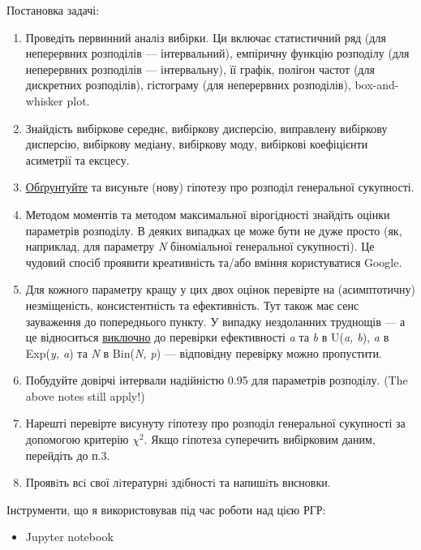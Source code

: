 \documentclass[14pt, a4paper, ukrainian]{extreport}
\begin{document}
	Постановка задачі:
	
	\begin{enumerate}
		\item Проведіть первинний аналіз вибірки. Ци включає статистичний ряд (для неперервних розподілів --- інтервальний), емпіричну функцію розподілу (для неперервних розподілів --- інтервальну), її графік, полігон частот (для дискретних розподілів), гістограму (для неперервних розподілів), box-and-whisker plot.
		
		\item Знайдість вибіркове середнє, вибіркову дисперсію, виправлену вибіркову дисперсію, вибіркову медіану, вибіркову моду, вибіркові коефіцієнти асиметрії та ексцесу.
		
		\item \underline{Обґрунтуйте} та висуньте (нову) гіпотезу про розподіл генеральної сукупності.
		
		\item Методом моментів та методом максимальної вірогідності знайдіть оцінки параметрів розподілу. В деяких випадках це може бути не дуже просто (як, наприклад, для параметру \textit{N} біноміальної генеральної сукупності). Це чудовий спосіб проявити креативність та/або вміння користуватися Google.
		
		\item Для кожного параметру кращу у цих двох оцінок перевірте на \break
		(асимптотичну) незміщеність, консистентність та ефективність. Тут також має сенс зауваження до попереднього пункту. У випадку \break нездоланних труднощів --- а це відноситься \underline{виключно} до перевірки ефективності \textit{a} та \textit{b} в U(\textit{a, b}), \textit{a} в Exp(\textit{y, a}) та \textit{N} в Bin(\textit{N, p}) --- відповідну перевірку можно пропустити.
		
		\item Побудуйте довірчі інтервали надійністю 0.95 для параметрів розподілу. (The above notes still apply!)		
		
		\item Нарешті перевірте висунуту гіпотезу про розподіл генеральної сукупності за допомогою критерію $\chi^2$. Якщо гіпотеза суперечить вибірковим даним, перейдіть до п.3.
		
		\item Проявiть всi свої лiтературнi здiбностi та напишiть висновки.
		
	\end{enumerate}

	Інструменти, що я використовував під час роботи над цією РГР:
	\begin{itemize}
		\item Jupyter notebook
	\end{itemize}
	
\end{document}
